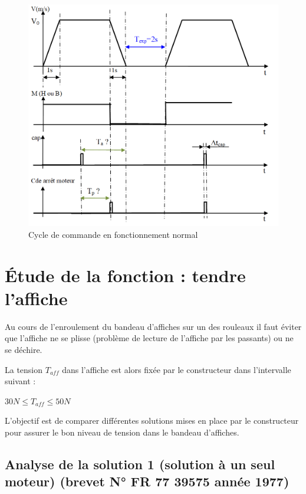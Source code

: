 \begin{figure}[!h]
\begin{center}
	\includegraphics[width=0.7\linewidth]{img/fig07}
\end{center}
	\caption{Cycle de commande en fonctionnement normal}
	\label{fig07}
\end{figure}




\section{Étude de la fonction : \og tendre l'affiche \fg}

Au cours de l'enroulement du bandeau d'affiches sur un des rouleaux il faut éviter que l'affiche ne se plisse (problème de lecture de l'affiche par les passants) ou ne se déchire.

La tension $T_{aff}$ dans l'affiche est alors fixée par le constructeur dans l'intervalle suivant :
\begin{center}
$30N\leq T_{aff} \leq50N$
\end{center}

L'objectif est de comparer différentes solutions mises en place par le constructeur pour assurer le bon niveau de tension dans le bandeau d'affiches.

\subsection{Analyse de la solution 1 (solution à un seul moteur) (brevet N° FR 77 39575 année 1977)}

